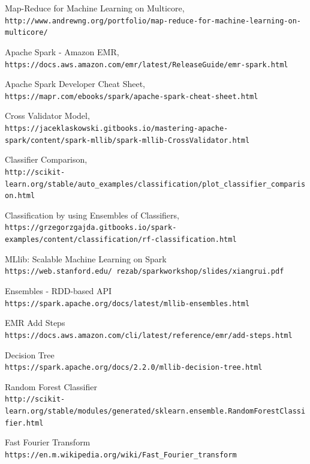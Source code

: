 \documentclass{neu_handout}
\begin{document}
\begin{thebibliography}{9}

Map-Reduce for Machine Learning on Multicore,
\\\texttt{http://www.andrewng.org/portfolio/map-reduce-for-machine-learning-on-multicore/}

Apache Spark - Amazon EMR,
\\\texttt{https://docs.aws.amazon.com/emr/latest/ReleaseGuide/emr-spark.html}

Apache Spark Developer Cheat Sheet,
\\\texttt{https://mapr.com/ebooks/spark/apache-spark-cheat-sheet.html}

Cross Validator Model,
\\\texttt{https://jaceklaskowski.gitbooks.io/mastering-apache-spark/content/spark-mllib/spark-mllib-CrossValidator.html}

Classifier Comparison,
\\\texttt{http://scikit-learn.org/stable/auto\_examples/classification/plot\_classifier\_comparison.html}

Classification by using Ensembles of Classifiers,
\\\texttt{https://grzegorzgajda.gitbooks.io/spark-examples/content/classification/rf-classification.html}


MLlib: Scalable Machine Learning on Spark
\\\texttt{https://web.stanford.edu/~rezab/sparkworkshop/slides/xiangrui.pdf}


Ensembles - RDD-based API
\\\texttt{https://spark.apache.org/docs/latest/mllib-ensembles.html}

EMR Add Steps
\\\texttt{https://docs.aws.amazon.com/cli/latest/reference/emr/add-steps.html}

Decision Tree
\\\texttt{https://spark.apache.org/docs/2.2.0/mllib-decision-tree.html}

Random Forest Classifier
\\\texttt{http://scikit-learn.org/stable/modules/generated/sklearn.ensemble.RandomForestClassifier.html}

Fast Fourier Transform
\\\texttt{https://en.m.wikipedia.org/wiki/Fast\_Fourier\_transform}


\end{thebibliography}
\end{document}
